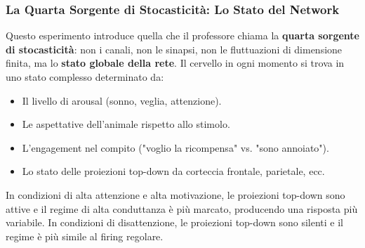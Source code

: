 \subsubsection{La Quarta Sorgente di Stocasticità: Lo Stato del Network}

Questo esperimento introduce quella che il professore chiama la \textbf{quarta sorgente di stocasticità}: non i canali, non le sinapsi, non le fluttuazioni di dimensione finita, ma lo \textbf{stato globale della rete}. Il cervello in ogni momento si trova in uno stato complesso determinato da:
\begin{itemize}
    \item Il livello di arousal (sonno, veglia, attenzione).
    \item Le aspettative dell'animale rispetto allo stimolo.
    \item L'engagement nel compito ("voglio la ricompensa" vs. "sono annoiato").
    \item Lo stato delle proiezioni top-down da corteccia frontale, parietale, ecc.
\end{itemize}

In condizioni di alta attenzione e alta motivazione, le proiezioni top-down sono attive e il regime di alta conduttanza è più marcato, producendo una risposta più variabile. In condizioni di disattenzione, le proiezioni top-down sono silenti e il regime è più simile al firing regolare.

